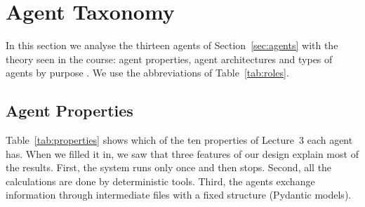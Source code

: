 \DeclareRobustCommand{\pfull}{\tikz[baseline=-0.6ex]\fill (0,0) circle (0.8ex);}
\DeclareRobustCommand{\phalf}{\tikz[baseline=-0.6ex]{\draw (0,0) circle (0.8ex);
  \fill (0,-0.8ex) arc (-90:90:0.8ex) -- cycle;}}
\DeclareRobustCommand{\pnone}{\tikz[baseline=-0.6ex]\draw (0,0) circle (0.8ex);}
\providecommand{\rot}[1]{\rotatebox{75}{#1}}

\section{Agent Taxonomy}
\label{sec:taxonomy}

In this section we analyse the thirteen agents of Section~\ref{sec:agents} with the theory
seen in the course: agent properties, agent architectures and types of agents by purpose
\cite{lecture2, lecture3, wooldridge2009}. We use the abbreviations of
Table~\ref{tab:roles}.

\subsection{Agent Properties}
\label{sec:properties}

Table~\ref{tab:properties} shows which of the ten properties of Lecture~3 each agent has.
When we filled it in, we saw that three features of our design explain most of the
results. First, the system runs only once and then stops. Second, all the calculations
are done by deterministic tools. Third, the agents exchange information through
intermediate files with a fixed structure (Pydantic models).

